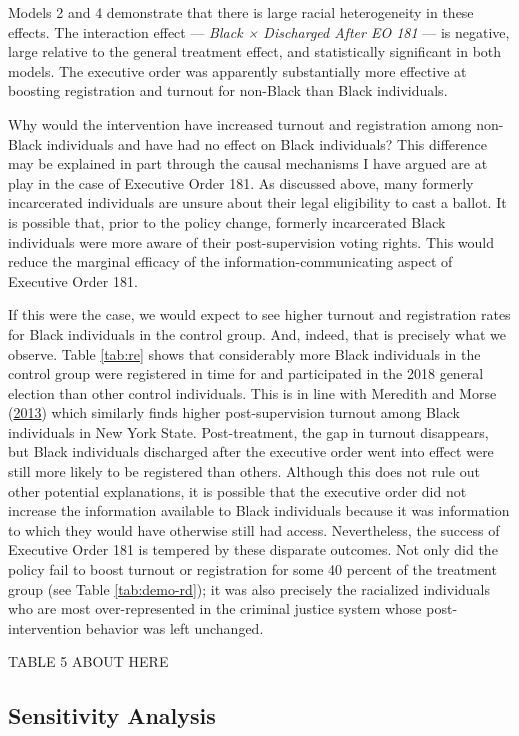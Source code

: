 \documentclass[
  12pt,
]{article}
\begin{document}
Models 2 and 4 demonstrate that there is large racial heterogeneity in these effects. The interaction effect --- \emph{Black × Discharged After EO 181} --- is negative, large relative to the general treatment effect, and statistically significant in both models. The executive order was apparently substantially more effective at boosting registration and turnout for non-Black than Black individuals.

Why would the intervention have increased turnout and registration among non-Black individuals and have had no effect on Black individuals? This difference may be explained in part through the causal mechanisms I have argued are at play in the case of Executive Order 181. As discussed above, many formerly incarcerated individuals are unsure about their legal eligibility to cast a ballot. It is possible that, prior to the policy change, formerly incarcerated Black individuals were more aware of their post-supervision voting rights. This would reduce the marginal efficacy of the information-communicating aspect of Executive Order 181.

If this were the case, we would expect to see higher turnout and registration rates for Black individuals in the control group. And, indeed, that is precisely what we observe. Table \ref{tab:re} shows that considerably more Black individuals in the control group were registered in time for and participated in the 2018 general election than other control individuals. This is in line with Meredith and Morse (\protect\hyperlink{ref-Meredith2013}{2013}) which similarly finds higher post-supervision turnout among Black individuals in New York State. Post-treatment, the gap in turnout disappears, but Black individuals discharged after the executive order went into effect were still more likely to be registered than others. Although this does not rule out other potential explanations, it is possible that the executive order did not increase the information available to Black individuals because it was information to which they would have otherwise still had access. Nevertheless, the success of Executive Order 181 is tempered by these disparate outcomes. Not only did the policy fail to boost turnout or registration for some 40 percent of the treatment group (see Table \ref{tab:demo-rd}); it was also precisely the racialized individuals who are most over-represented in the criminal justice system whose post-intervention behavior was left unchanged.

TABLE 5 ABOUT HERE

\hypertarget{sensitivity-analysis}{%
\subsection*{Sensitivity Analysis}\label{sensitivity-analysis}}
\end{document}
